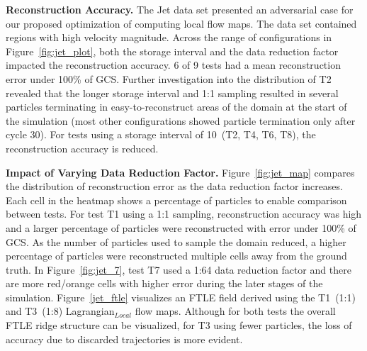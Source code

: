 

\textbf{Reconstruction Accuracy.} The Jet data set presented an adversarial case for our proposed optimization of computing local flow maps.
%
The data set contained regions with high velocity magnitude.
%
Across the range of configurations in Figure~\ref{fig:jet_plot}, both the storage interval and the data reduction factor impacted the reconstruction accuracy.
%
6 of 9 tests had a mean reconstruction error under 100\% of GCS. 
%
Further investigation into the distribution of T2 revealed that the longer storage interval and 1:1 sampling resulted in several particles terminating in easy-to-reconstruct areas of the domain at the start of the simulation (most other configurations showed particle termination only after cycle 30).
%
For tests using a storage interval of 10~(T2, T4, T6, T8), the reconstruction accuracy is reduced.
%


\textbf{Impact of Varying Data Reduction Factor.} Figure~\ref{fig:jet_map} compares the distribution of reconstruction error as the data reduction factor increases. 
%
Each cell in the heatmap shows a percentage of particles to enable comparison between tests.
%
For test T1 using a 1:1 sampling, reconstruction accuracy was high and a larger percentage of particles were reconstructed with error under 100\% of GCS.
%
As the number of particles used to sample the domain reduced, a higher percentage of particles were reconstructed multiple cells away from the ground truth. 
%
In Figure~\ref{fig:jet_7}, test T7 used a 1:64 data reduction factor and there are more red/orange cells with higher error during the later stages of the simulation. 
%
{Figure~\ref{jet_ftle} visualizes an FTLE field derived using the T1~(1:1) and T3~(1:8) Lagrangian$_{Local}$ flow maps.
%
Although for both tests the overall FTLE ridge structure can be visualized, for T3 using fewer particles, the loss of accuracy due to discarded trajectories is more evident. 
%
}
